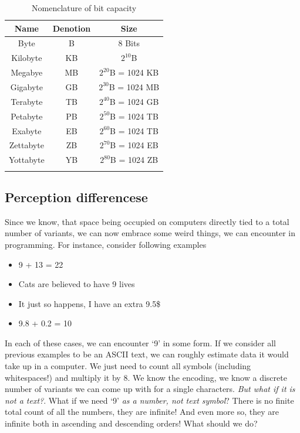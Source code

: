 \documentclass{report}
\begin{document}
            \begin{table}[h]
                \centering
                \begin{longtable}{ccc}
                    \toprule
                    Name & Denotion & Size \\
                    \toprule
                    Byte & B & 8 Bits \\
                    Kilobyte & KB & $2^{10}$B \\
                    Megabye & MB & $2^{20}$B = 1024 KB \\
                    Gigabyte & GB & $2^{30}$B = 1024 MB \\
                    Terabyte & TB & $2^{40}$B = 1024 GB \\
                    Petabyte & PB & $2^{50}$B = 1024 TB \\
                    Exabyte & EB & $2^{60}$B = 1024 TB \\
                    Zettabyte & ZB & $2^{70}$B = 1024 EB \\
                    Yottabyte & YB & $2^{80}$B = 1024 ZB \\
                    \bottomrule
                    \caption{Nomenclature of bit capacity}
                \end{longtable}
            \end{table}

            \subsection{Perception differencese}

            Since we know, that space being occupied on computers directly tied to a total number of variants, we can now embrace some weird things, we can encounter
            in programming. For instance, consider following examples

            \begin{itemize}
                \item 9 + 13 = 22
                \item Cats are believed to have 9 lives
                \item It just so happens, I have an extra 9.5\$
                \item 9.8 + 0.2 = 10
            \end{itemize}

            In each of these cases, we can encounter `9' in some form. If we consider all previous examples to be an ASCII text, we can roughly estimate data it would take up in 
            a computer. We just need to count all symbols (including whitespaces!) and multiply it by 8. We know the encoding, we know a discrete number of variants we can
            come up with for a single characters. \emph{But what if it is not a text?}. What if we need `9' \emph{as a number, not text symbol}? There is no finite total count
            of all the numbers, they are infinite! And even more so, they are infinite both in ascending and descending orders! What should we do? \par
            
\end{document}
